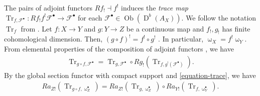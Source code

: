 \documentclass[a4paper,dvipdfmx,reqno,12pt]{amsart}
\theoremstyle{definition}
\newcommand{\opn}[1]{\operatorname{#1}}
\numberwithin{equation}{section}
\begin{document}
The pairs of adjoint functors $Rf_! \dashv f^{!}$ 
induces the \emph{trace map} $\opn{Tr}_{f,\mathcal{F}^{\bullet}}\colon Rf_!f^{!}\mathcal{F}^{\bullet}
\to \mathcal{F}^{\bullet}$ for each 
$\mathcal{F}^{\bullet}\in \opn{Ob}(\opn{D}^{b}(A_X))$.
We follow the notation $\opn{Tr}_f$ from 
\cite[p.20]{MR1299726}.
Let $f\colon X\to Y $ and $g\colon Y\to Z$ be 
a continuous map and $f_!,g_!$ has finite cohomological 
dimension. Then, $(g\circ f)^{!}=f^{!}\circ g^{!}$
\cite[Proposition 3.1.8]{MR1299726}.
In particular, $\upomega_X=f^{!}\upomega_Y$.
From elemental properties of the composition of
adjoint functors \cite[p.103]{MR1712872}, we have
\begin{align}
\label{equation-trace}
\opn{Tr}_{g\circ f,\mathcal{F}^{\bullet}}=
\opn{Tr}_{g,\mathcal{F}^{\bullet}} 
\circ Rg_!(\opn{Tr}_{f,g^{!}(\mathcal{F}^{\bullet})}).
\end{align}
By the global section functor with compact support and
\cref{equation-trace}, we have
\begin{align}
\label{equation-trace-push}
Ra_{Z!}(\opn{Tr}_{g\circ f,\upomega_{Z}^{\bullet}})
=Ra_{Z!}(\opn{Tr}_{g,\upomega_{Z}^{\bullet}})
\circ Ra_{Y!}(\opn{Tr}_{f,\upomega_{Y}^{\bullet}}).
\end{align}








\printindex
\end{document}

